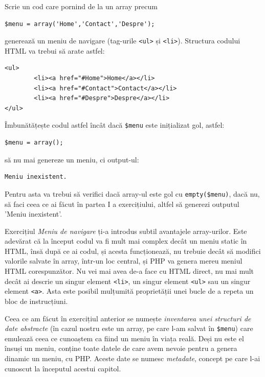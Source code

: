 \begin{Exercise}[title={Meniu de navigare},difficulty=1]

\ExePart

Scrie un cod care pornind de la un array precum
\begin{lstlisting}
$menu = array('Home','Contact','Despre');
\end{lstlisting}
generează un meniu de navigare (tag-urile \texttt{<ul>} și \texttt{<li>}).
Structura codului HTML va trebui să arate astfel:
\begin{verbatim}
<ul>
        <li><a href="#Home">Home</a></li>
        <li><a href="#Contact">Contact</a></li>
        <li><a href="#Despre">Despre</a></li>
</ul>
\end{verbatim}

\ExePart
Îmbunătățește codul astfel încât dacă \texttt{\$menu} este inițializat gol, astfel:
\begin{lstlisting}
$menu = array();
\end{lstlisting}
să nu mai genereze un meniu, ci output-ul:
\begin{verbatim}
Meniu inexistent.
\end{verbatim}
Pentru asta va trebui să verifici dacă array-ul este gol cu \texttt{empty(\$menu)}, dacă
nu, să faci ceea ce ai făcut în partea I a exercițiului, altfel să generezi
outputul 'Meniu inexistent'.
\end{Exercise}
Exercițiul \textit{Meniu de navigare} ți-a introdus subtil avantajele
array-urilor. Este adevărat că la început codul va fi mult mai
complex decât un meniu static în HTML, însă după ce ai codul, și
acesta funcționează, nu trebuie decât să modifici valorile salvate
în array, într-un loc {\glqq}central{\grqq}, și PHP va genera mereu meniul HTML corespunzător.
Nu vei mai avea de-a face cu HTML direct, nu mai mult decât ai descrie un singur element
\texttt{<li>}, un singur element \texttt{<ul>} sau un singur element \texttt{<a>}.
Asta este posibil mulțumită proprietății unei bucle de a repeta un bloc de instrucțiuni.

Ceea ce am făcut în exercițiul anterior
se numește \textit{inventarea unei structuri de date abstracte} (în cazul
nostru este un array, pe care
l-am salvat în \texttt{\$menu}) care emulează ceea ce cunoaștem ca fiind un {\glqq}meniu{\grqq} în {\glqq}viața reală{\grqq}.
Deși nu este el însuși un meniu, conține toate datele de care avem nevoie
pentru a genera dinamic un meniu, cu PHP. Aceste date se numesc \textsl{metadate},
concept pe care l-ai cunoscut la începutul acestui capitol.

